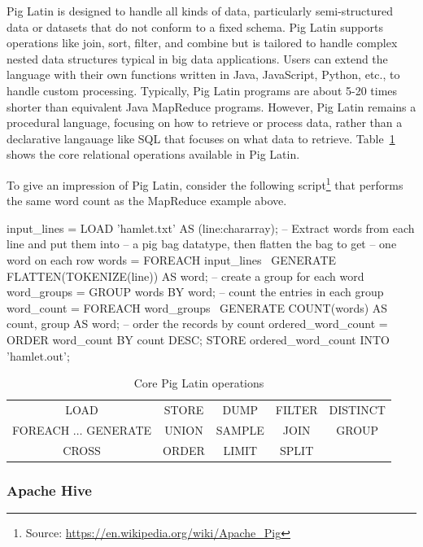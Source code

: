 Pig Latin is designed to handle all kinds of data, particularly semi-structured data or datasets that do not conform to a fixed schema. Pig Latin supports operations like join, sort, filter, and combine but is tailored to handle complex nested data structures typical in big data applications. Users can extend the language with their own functions written in Java, JavaScript, Python, etc., to handle custom processing. Typically, Pig Latin programs are about 5-20 times shorter than equivalent Java MapReduce programs. However, Pig Latin remains a procedural language, focusing on how to retrieve or process data, rather than a declarative langauage like SQL that focuses on what data to retrieve. Table~\ref{tab:pigoperators} shows the core relational operations available in Pig Latin.

To give an impression of Pig Latin, consider the following script\footnote{\small Source: \url{https://en.wikipedia.org/wiki/Apache_Pig}} that performs the same word count as the MapReduce example above.

\begin{sqlcode}
input_lines = LOAD 'hamlet.txt' AS (line:chararray);
-- Extract words from each line and put them into 
-- a pig bag datatype, then flatten the bag to get
-- one word on each row
words = FOREACH input_lines \
   GENERATE FLATTEN(TOKENIZE(line)) AS word;
-- create a group for each word
word_groups = GROUP words BY word;
-- count the entries in each group
word_count = FOREACH word_groups  \
   GENERATE COUNT(words) AS count, group AS word;
-- order the records by count
ordered_word_count = ORDER word_count BY count DESC;
STORE ordered_word_count INTO 'hamlet.out';
\end{sqlcode}

\begin{table}
\centering

\renewcommand{\arraystretch}{1.5}
\begin{tabular}{ccccc} 
LOAD & STORE & DUMP & FILTER & DISTINCT \\
FOREACH $\ldots$ GENERATE & UNION & SAMPLE & JOIN & GROUP \\
CROSS & ORDER & LIMIT & SPLIT \\
\end{tabular}
\caption{Core Pig Latin operations}
\label{tab:pigoperators}
\end{table}


\subsubsection*{Apache Hive}

